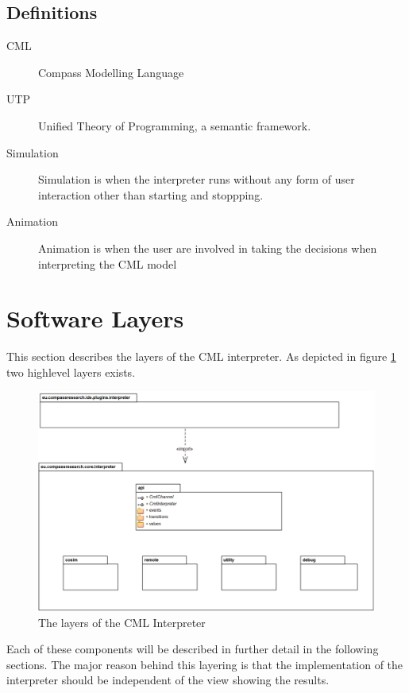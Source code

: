 \documentclass[a4paper, 10pt]{include/compassreport}   %
\begin{document}
\subsection{Definitions}
\begin{description}
\item[CML] Compass Modelling Language
\item[UTP] Unified Theory of Programming, a semantic framework.
\item[Simulation] Simulation is when the interpreter runs without
  any form of user interaction other than starting and stoppping.
\item[Animation] Animation is when the user are involved in taking
  the decisions when interpreting the CML model
\end{description}

\section{Software Layers}
\label{sec:software_layers}
This section describes the layers of the CML
interpreter. As depicted in figure \ref{fig:layers} two highlevel layers exists.

\begin{figure}[ht!]
  \begin{center}
    \includegraphics[width=1\textwidth]{figures/layers}
    \caption{The layers of the CML Interpreter}
    \label{fig:layers}
  \end{center}
\end{figure}

Each of these components will be described in further detail in the
following sections. The major reason behind this layering is that the
implementation of the interpreter should be independent of the view
showing the results.
\end{document}
